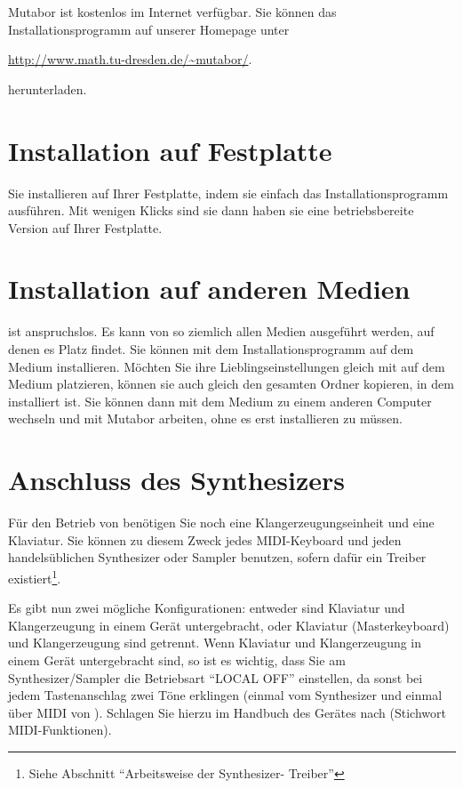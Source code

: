 Mutabor ist kostenlos im Internet verfügbar. Sie können das
Installationsprogramm auf unserer Homepage unter
\begin{center}
{\url{http://www.math.tu-dresden.de/~mutabor/}}.
\end{center}
herunterladen.

\section{Installation auf Festplatte}\label{sec:inst-auf-festpl-1}

Sie installieren \mutabor{} auf Ihrer Festplatte, indem sie einfach das
Installationsprogramm ausführen. Mit wenigen Klicks sind sie dann
haben sie eine betriebsbereite Version auf Ihrer Festplatte. 

\section{Installation auf anderen Medien}\label{sec:inst-auf-ander}

\mutabor{} ist anspruchslos. Es kann von so ziemlich allen Medien
ausgeführt werden, auf denen es Platz findet. Sie können \mutabor{}
mit dem Installationsprogramm auf dem Medium installieren. Möchten Sie
ihre Lieblingseinstellungen gleich mit auf dem Medium platzieren,
können sie auch gleich den gesamten Ordner kopieren, in dem \mutabor{}
installiert ist. Sie können dann mit dem Medium zu einem anderen
Computer wechseln und mit Mutabor arbeiten, ohne es erst installieren
zu müssen.

\section{Anschluss des Synthesizers}\label{sec:anschl-des-synth}
\label{ANSCHLUSS}
Für den Betrieb von \mutabor{} benötigen Sie noch
eine Klangerzeugungseinheit und eine Klaviatur. Sie können zu
diesem Zweck jedes MIDI-Keyboard und jeden handelsüblichen
Synthesizer oder Sampler benutzen, sofern dafür ein Treiber
existiert\footnote{Siehe Abschnitt "`Arbeitsweise der Synthesizer-
Treiber"'}.

Es gibt nun zwei mögliche Konfigurationen: entweder sind Klaviatur
und Klangerzeugung in einem Gerät untergebracht, oder Klaviatur
(Masterkeyboard) und Klangerzeugung sind getrennt.
Wenn Klaviatur und Klang\-er\-zeu\-gung in einem Gerät untergebracht
sind, so ist es wichtig, dass Sie am Synthesizer/Sampler die
Betriebsart "`LOCAL OFF"' einstellen, da sonst bei jedem
Tastenanschlag zwei Töne erklingen (einmal vom Synthesizer und einmal über MIDI
von \mutabor{}). Schlagen Sie hierzu im Handbuch des Gerätes nach
(Stichwort MIDI-Funktionen).

